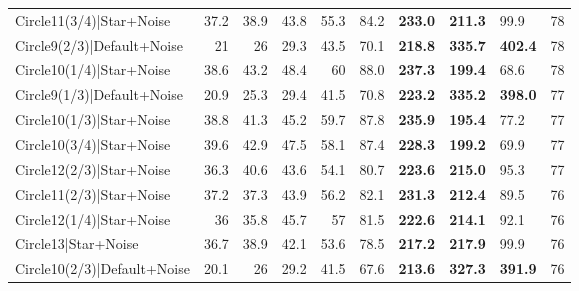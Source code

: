 \begin{tabular}{lrrrrllllr}
 Circle11(3/4)|Star+Noise                             &         37.2 &         38.9 &         43.8 &            55.3 & 84.2           & \textbf{233.0} & \textbf{211.3} & 99.9           &           78 \\
 Circle9(2/3)|Default+Noise                           &         21   &         26   &         29.3 &            43.5 & 70.1           & \textbf{218.8} & \textbf{335.7} & \textbf{402.4} &           78 \\
 Circle10(1/4)|Star+Noise                             &         38.6 &         43.2 &         48.4 &            60   & 88.0           & \textbf{237.3} & \textbf{199.4} & 68.6           &           78 \\
 Circle9(1/3)|Default+Noise                           &         20.9 &         25.3 &         29.4 &            41.5 & 70.8           & \textbf{223.2} & \textbf{335.2} & \textbf{398.0} &           77 \\
 Circle10(1/3)|Star+Noise                             &         38.8 &         41.3 &         45.2 &            59.7 & 87.8           & \textbf{235.9} & \textbf{195.4} & 77.2           &           77 \\
 Circle10(3/4)|Star+Noise                             &         39.6 &         42.9 &         47.5 &            58.1 & 87.4           & \textbf{228.3} & \textbf{199.2} & 69.9           &           77 \\
 Circle12(2/3)|Star+Noise                             &         36.3 &         40.6 &         43.6 &            54.1 & 80.7           & \textbf{223.6} & \textbf{215.0} & 95.3           &           77 \\
 Circle11(2/3)|Star+Noise                             &         37.2 &         37.3 &         43.9 &            56.2 & 82.1           & \textbf{231.3} & \textbf{212.4} & 89.5           &           76 \\
 Circle12(1/4)|Star+Noise                             &         36   &         35.8 &         45.7 &            57   & 81.5           & \textbf{222.6} & \textbf{214.1} & 92.1           &           76 \\
 Circle13|Star+Noise                                  &         36.7 &         38.9 &         42.1 &            53.6 & 78.5           & \textbf{217.2} & \textbf{217.9} & 99.9           &           76 \\
 Circle10(2/3)|Default+Noise                          &         20.1 &         26   &         29.2 &            41.5 & 67.6           & \textbf{213.6} & \textbf{327.3} & \textbf{391.9} &           76 \\

\end{tabular}
